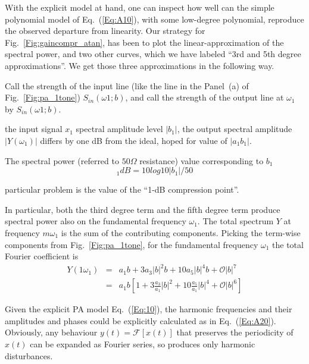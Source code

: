 \documentclass[11pt,oneside,a4paper]{scrartcl}
\newcommand{\EQ}[1]{\begin{equation}\label{Eq:#1}}
\newcommand{\EE}{\end{equation}}
\newcommand{\Eq}[1]{Eq.~(\ref{Eq:#1})}
\newcommand{\Fig}[1]{Fig.~\ref{Fig:#1}}
\newcommand{\abs}[1]{\ensuremath{|#1|}}
\newcommand{\Abs}[1]{\ensuremath{\left|#1\right|}}
\begin{document}
With the explicit model at hand, one can inspect how well can the simple polynomial model of \Eq{A10}, with some low-degree polynomial, reproduce the observed departure from linearity. Our strategy for \Fig{gaincompr_atan}, has been to plot the linear-approximation of the spectral power, and two other curves, which we have labeled ``3rd and 5th degree approximations''. We get those three approximations in the following way.




Call the strength of the input line (like the line in the Panel~(a) of \Fig{pa_1tone}) $S_{in}(\omega1;b)$, and call the strength of the output line at $\omega_1$ by $S_{in}(\omega1;b)$. 

the input signal $x_1$ spectral amplitude level $\Abs{b_1}$, the output spectral amplitude \abs{Y(\omega_1)} differs by one dB from the ideal, hoped for value of  $\abs{a_1 b_1}$. 


The spectral power (referred to $50\Omega$ resistance) value corresponding to $b_1$
\EQ
	b_1dB = 10 log10 \Abs{b_1}/50
\EE

 particular problem is the value of the ``1-dB compression point''.

In particular, both the third degree term and the fifth degree term produce spectral power also on the fundamental frequency $\omega_1$. The total spectrum $Y$ at frequency $m\omega_1$ is the sum of the contributing components. Picking the term-wise components from \Fig{pa_1tone}, for the fundamental frequency $\omega_1$ the total Fourier coefficient is
\begin{eqnarray}
	Y(1\omega_1) &=& a_1 b 
		+ 3 a_3 \Abs{b}^2 b 
		+ 10a_5 \Abs{b}^4 b 
		+ \mathcal{O}\Abs{b}^7 \nonumber \\
		&=& a_1 b
		\left[
			1
			+3 \frac {a_3}{a_1} \Abs{b}^2
			+10 \frac {a_5}{a_1} \Abs{b}^4
			+\mathcal{O}\Abs{b}^6
		\right]
\end{eqnarray}


Given the explicit PA model \Eq{10}, the harmonic frequencies and their amplitudes and phases could be explicitly calculated as in \Eq{A20}. Obviously, any behaviour $y(t) = \mathcal{F}[x(t)]$ that preserves the periodicity of $x(t)$ can be expanded as Fourier series, so produces only harmonic disturbances. 
\end{document}
